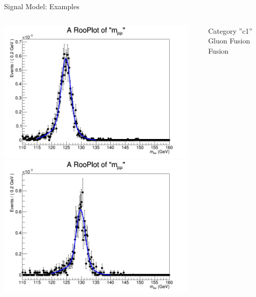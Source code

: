 \documentclass[pdf, 9pt]{beamer}
\begin{document}
\begin{frame}{Signal Model: Examples}
\begin{columns}[T]
\begin{column}{0.33\textwidth}
\begin{center}
          \includegraphics[width=0.95\textwidth, height=0.3\textheight]{figs/higgs/signalmodel/bdt/bdt_110to160_withSys/signalFit__c0__125__VBF__TripleGaus__default.png}\\
          \includegraphics[width=0.95\textwidth, height=0.3\textheight]{figs/higgs/signalmodel/bdt/bdt_110to160_withSys/signalFit__c0__130__VBF__TripleGaus__default.png}
        \end{center}
      \end{column}
      \begin{column}{0.33\textwidth}
        \begin{center}
          \tiny{Category ''c1'' Gluon Fusion Fusion}\\

\end{center}
\end{column}
\end{columns}
\end{frame}
\end{document}
